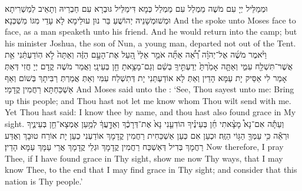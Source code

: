 {וּמְמַלֵּיל יְיָ עִם מֹשֶׁה מַמְלַל עִם מַמְלַל כְּמָא דִּימַלֵּיל גּוּבְרָא עִם חַבְרֵיהּ וְתָאֵיב לְמַשְׁרִיתָא וּמְשׁוּמְשָׁנֵיהּ יְהוֹשֻׁעַ בַּר נוּן עוּלֵימָא לָא עָדֵי מִגּוֹ מַשְׁכְּנָא׃}
{And the \lord\space spoke unto Moses face to face, as a man speaketh unto his friend. And he would return into the camp; but his minister Joshua, the son of Nun, a young man, departed not out of the Tent.}{}
{וַיֹּ֨אמֶר מֹשֶׁ֜ה אֶל־יְהֹוָ֗ה רְ֠אֵ֠ה אַתָּ֞ה אֹמֵ֤ר אֵלַי֙ הַ֚עַל אֶת־הָעָ֣ם הַזֶּ֔ה וְאַתָּה֙ לֹ֣א הֽוֹדַעְתַּ֔נִי אֵ֥ת אֲשֶׁר־תִּשְׁלַ֖ח עִמִּ֑י וְאַתָּ֤ה אָמַ֙רְתָּ֙ יְדַעְתִּ֣יךָֽ בְשֵׁ֔ם וְגַם־מָצָ֥אתָ חֵ֖ן בְּעֵינָֽי׃
}
{וַאֲמַר מֹשֶׁה קֳדָם יְיָ חֲזִי דְּאַתְּ אָמַר לִי אַסֵּיק יָת עַמָּא הָדֵין וְאַתְּ לָא אוֹדַעְתַּנִי יָת דְּתִשְׁלַח עִמִּי וְאַתְּ אֲמַרְתְּ רַבִּיתָךְ בְּשׁוֹם וְאַף אַשְׁכַּחְתָּא רַחֲמִין קֳדָמָי׃}
{And Moses said unto the \lord: ‘See, Thou sayest unto me: Bring up this people; and Thou hast not let me know whom Thou wilt send with me. Yet Thou hast said: I know thee by name, and thou hast also found grace in My sight.}{}
{וְעַתָּ֡ה אִם־נָא֩ מָצָ֨אתִי חֵ֜ן בְּעֵינֶ֗יךָ הוֹדִעֵ֤נִי נָא֙ אֶת־דְּרָכֶ֔ךָ וְאֵדָ֣עֲךָ֔ לְמַ֥עַן אֶמְצָא־חֵ֖ן בְּעֵינֶ֑יךָ וּרְאֵ֕ה כִּ֥י עַמְּךָ֖ הַגּ֥וֹי הַזֶּֽה׃
}
{וּכְעַן אִם כְּעַן אַשְׁכַּחִית רַחֲמִין קֳדָמָךְ אוֹדַעְנִי כְעַן יָת אוֹרַח טוּבָךְ וְאֶדַּע רַחֲמָךְ בְּדִיל דְּאַשְׁכַּח רַחֲמִין קֳדָמָךְ וּגְלֵי קֳדָמָךְ אֲרֵי עַמָּךְ עַמָּא הָדֵין׃}
{Now therefore, I pray Thee, if I have found grace in Thy sight, show me now Thy ways, that I may know Thee, to the end that I may find grace in Thy sight; and consider that this nation is Thy people.’}{}
